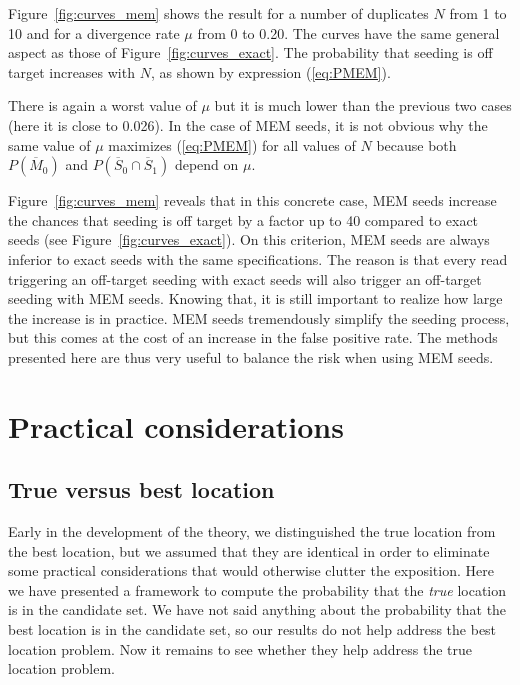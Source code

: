 \documentclass{article}
\begin{document}
Figure~\ref{fig:curves_mem} shows the result for a number of duplicates $N$
from 1 to 10 and for a divergence rate $\mu$ from 0 to 0.20. The curves
have the same general aspect as those of Figure~\ref{fig:curves_exact}. The
probability that seeding is off target increases with $N$, as shown by
expression (\ref{eq:PMEM}).

There is again a  worst value of $\mu$ but it is much lower than the
previous two cases (here it is close to 0.026). In the case of MEM seeds,
it is not obvious why the same value of $\mu$ maximizes (\ref{eq:PMEM})
for all values of $N$ because both $P(\overline{M}_0)$ and
$P(\overline{S}_0 \cap \overline{S}_1)$ depend on $\mu$.

Figure~\ref{fig:curves_mem} reveals that in this concrete case, MEM seeds
increase the chances that seeding is off target by a factor up to 40
compared to exact seeds (see Figure~\ref{fig:curves_exact}). On this
criterion, MEM seeds are always inferior to exact seeds with the same
specifications. The reason is that every read triggering an off-target
seeding with exact seeds will also trigger an off-target seeding with MEM
seeds. Knowing that, it is still important to realize how large the
increase is in practice. MEM seeds tremendously simplify the seeding
process, but this comes at the cost of an increase in the false positive
rate. The methods presented here are thus very useful to balance the
risk when using MEM seeds.

\section{Practical considerations}

\subsection{True versus best location}
\label{sec:truevsbest}

Early in the development of the theory, we distinguished the true location
from the best location, but we assumed that they are identical in order to
eliminate some practical considerations that would otherwise clutter the
exposition. Here we have presented a framework to compute the probability
that the \emph{true} location is in the candidate set. We have not said
anything about the probability that the best location is in the candidate
set, so our results do not help address the best location problem. Now it
remains to see whether they help address the true location problem.
\end{document}

